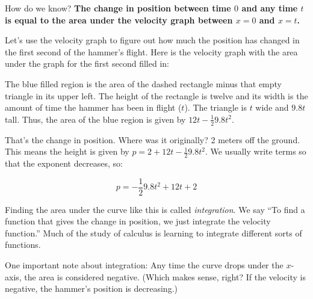 How do we know? \textbf{The change in position between time
  $0$ and any time $t$ is equal to the area under the velocity graph
  between $x = 0$ and $x = t$.}

Let's use the velocity graph to figure out how much the position has
changed in the first second of the hammer's flight. Here is the
velocity graph with the area under the graph for the first second filled
in:



The blue filled region is the area of the dashed rectangle minus that
empty triangle in its upper left.  The height of the rectangle is
twelve and its width is the amount of time the hammer has been in
flight ($t$). The triangle is $t$ wide and $9.8t$ tall. Thus, the
area of the blue region is given by $12t - \frac{1}{2}9.8 t^2$.

That's the change in position. Where was it originally? 2 meters off
the ground. This means the height is given by $p = 2 + 12t - \frac{1}{2}9.8t^2$.
We usually write terms so that the exponent decreases, so:

$$p = - \frac{1}{2}9.8t^2 + 12t + 2$$

Finding the area under the curve like this is called
\textit{integration}. We say ``To find a function that gives the
change in position, we just integrate the velocity function.''  Much
of the study of calculus is learning to integrate different sorts of
functions.

One important note about integration: Any time the curve drops under
the $x$-axis, the area is considered negative. (Which makes sense,
right? If the velocity is negative, the hammer's position is
decreasing.)


